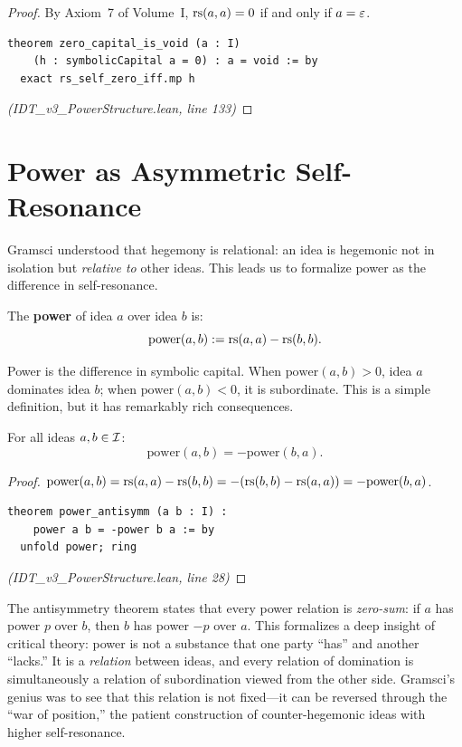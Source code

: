 \begin{proof}
By Axiom~7 of Volume~I, $\mathrm{rs}(a,a) = 0$ if and only if $a = \varepsilon$.
\begin{lstlisting}
theorem zero_capital_is_void (a : I)
    (h : symbolicCapital a = 0) : a = void := by
  exact rs_self_zero_iff.mp h
\end{lstlisting}
\textit{(IDT\_v3\_PowerStructure.lean, line 133)}
\end{proof}

\section{Power as Asymmetric Self-Resonance}

Gramsci understood that hegemony is relational: an idea is hegemonic not in
isolation but \emph{relative to} other ideas. This leads us to formalize
power as the difference in self-resonance.

\begin{definition}[Power]
\label{def:power}
The \textbf{power} of idea $a$ over idea $b$ is:
\[
  \mathrm{power}(a, b) := \mathrm{rs}(a,a) - \mathrm{rs}(b,b).
\]
\end{definition}

Power is the difference in symbolic capital. When $\mathrm{power}(a,b) > 0$,
idea $a$ dominates idea $b$; when $\mathrm{power}(a,b) < 0$, it is subordinate.
This is a simple definition, but it has remarkably rich consequences.

\begin{theorem}
\label{thm:power-antisymm}
For all ideas $a, b \in \mathcal{I}$:
\[
  \mathrm{power}(a, b) = -\mathrm{power}(b, a).
\]
\end{theorem}

\begin{proof}
$\mathrm{power}(a,b) = \mathrm{rs}(a,a) - \mathrm{rs}(b,b) = -(\mathrm{rs}(b,b) - \mathrm{rs}(a,a)) = -\mathrm{power}(b,a)$.
\begin{lstlisting}
theorem power_antisymm (a b : I) :
    power a b = -power b a := by
  unfold power; ring
\end{lstlisting}
\textit{(IDT\_v3\_PowerStructure.lean, line 28)}
\end{proof}

\begin{interpretation}
The antisymmetry theorem states that every power relation is \emph{zero-sum}: if
$a$ has power $p$ over $b$, then $b$ has power $-p$ over $a$. This formalizes
a deep insight of critical theory: power is not a substance that one party
``has'' and another ``lacks.'' It is a \emph{relation} between ideas, and every
relation of domination is simultaneously a relation of subordination viewed from
the other side. Gramsci's genius was to see that this relation is not fixed---it
can be reversed through the ``war of position,'' the patient construction of
counter-hegemonic ideas with higher self-resonance.
\end{interpretation}

